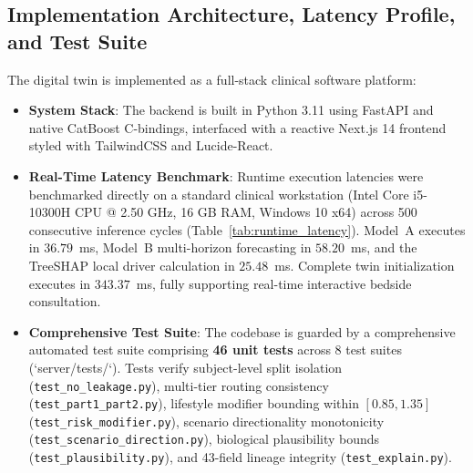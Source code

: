 \documentclass[11pt,a4paper]{article}
\begin{document}
\subsection{Implementation Architecture, Latency Profile, and Test Suite}
\label{sec:method_implementation}
The digital twin is implemented as a full-stack clinical software platform:
\begin{itemize}
    \item \textbf{System Stack}: The backend is built in Python 3.11 using FastAPI and native CatBoost C-bindings, interfaced with a reactive Next.js 14 frontend styled with TailwindCSS and Lucide-React.
    \item \textbf{Real-Time Latency Benchmark}: Runtime execution latencies were benchmarked directly on a standard clinical workstation (Intel Core i5-10300H CPU @ 2.50 GHz, 16 GB RAM, Windows 10 x64) across 500 consecutive inference cycles (Table~\ref{tab:runtime_latency}). Model~A executes in $36.79$~ms, Model~B multi-horizon forecasting in $58.20$~ms, and the TreeSHAP local driver calculation in $25.48$~ms. Complete twin initialization executes in $343.37$~ms, fully supporting real-time interactive bedside consultation.
    \item \textbf{Comprehensive Test Suite}: The codebase is guarded by a comprehensive automated test suite comprising \textbf{46 unit tests} across 8 test suites (`server/tests/`). Tests verify subject-level split isolation (\texttt{test\_no\_leakage.py}), multi-tier routing consistency (\texttt{test\_part1\_part2.py}), lifestyle modifier bounding within $[0.85, 1.35]$ (\texttt{test\_risk\_modifier.py}), scenario directionality monotonicity (\texttt{test\_scenario\_direction.py}), biological plausibility bounds (\texttt{test\_plausibility.py}), and 43-field lineage integrity (\texttt{test\_explain.py}).
\end{itemize}


\end{document}
